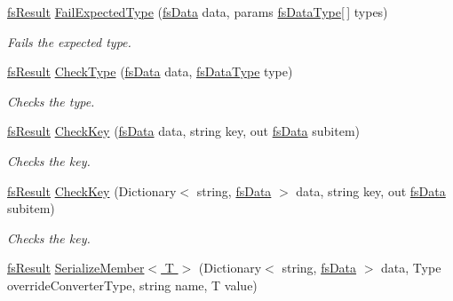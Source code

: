 \begin{DoxyCompactItemize}
\item 
\hyperlink{struct_full_serializer_1_1fs_result}{fs\+Result} \hyperlink{class_full_serializer_1_1fs_base_converter_a764855bf8818b5ff93077ea0a9e944b0}{Fail\+Expected\+Type} (\hyperlink{class_full_serializer_1_1fs_data}{fs\+Data} data, params \hyperlink{namespace_full_serializer_a6eee33d63b94e40fdfcfc59af9fcfc82}{fs\+Data\+Type}\mbox{[}$\,$\mbox{]} types)
\begin{DoxyCompactList}\small\item\em Fails the expected type. \end{DoxyCompactList}\item 
\hyperlink{struct_full_serializer_1_1fs_result}{fs\+Result} \hyperlink{class_full_serializer_1_1fs_base_converter_a2dbb1442ec90c3100b09308b9c53aab9}{Check\+Type} (\hyperlink{class_full_serializer_1_1fs_data}{fs\+Data} data, \hyperlink{namespace_full_serializer_a6eee33d63b94e40fdfcfc59af9fcfc82}{fs\+Data\+Type} type)
\begin{DoxyCompactList}\small\item\em Checks the type. \end{DoxyCompactList}\item 
\hyperlink{struct_full_serializer_1_1fs_result}{fs\+Result} \hyperlink{class_full_serializer_1_1fs_base_converter_ab42a513c517a3ed26ea228bb33aedd47}{Check\+Key} (\hyperlink{class_full_serializer_1_1fs_data}{fs\+Data} data, string key, out \hyperlink{class_full_serializer_1_1fs_data}{fs\+Data} subitem)
\begin{DoxyCompactList}\small\item\em Checks the key. \end{DoxyCompactList}\item 
\hyperlink{struct_full_serializer_1_1fs_result}{fs\+Result} \hyperlink{class_full_serializer_1_1fs_base_converter_a92ebde736d45f36473691936e6cd0147}{Check\+Key} (Dictionary$<$ string, \hyperlink{class_full_serializer_1_1fs_data}{fs\+Data} $>$ data, string key, out \hyperlink{class_full_serializer_1_1fs_data}{fs\+Data} subitem)
\begin{DoxyCompactList}\small\item\em Checks the key. \end{DoxyCompactList}\item 
\hyperlink{struct_full_serializer_1_1fs_result}{fs\+Result} \hyperlink{class_full_serializer_1_1fs_base_converter_a024019330f070b9fb3d49a5213c9aae8}{Serialize\+Member$<$ T $>$} (Dictionary$<$ string, \hyperlink{class_full_serializer_1_1fs_data}{fs\+Data} $>$ data, Type override\+Converter\+Type, string name, T value)

\end{DoxyCompactItemize}

